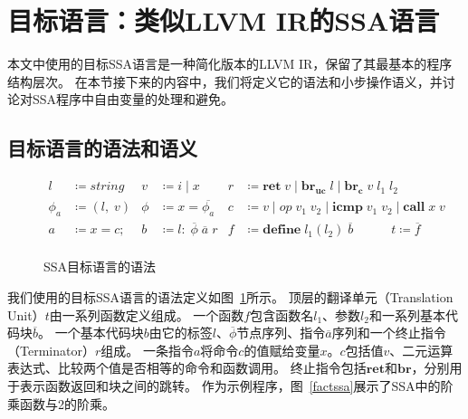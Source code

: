 \section{目标语言：类似LLVM IR的SSA语言}

本文中使用的目标SSA语言是一种简化版本的LLVM IR，保留了其最基本的程序结构层次。
在本节接下来的内容中，我们将定义它的语法和小步操作语义，并讨论对SSA程序中自由变量的处理和避免。

\subsection{目标语言的语法和语义}

\begin{figure}[htbp]
    \centering
    \begin{equation}
        \nonumber
        \begin{aligned}
            l &\coloneqq string & v &\coloneqq i\; |\; x & r &\coloneqq \mathbf{ret}\; v\; |\; \mathbf{br_{uc}}\; l\; |\; \mathbf{br_c}\; v\; l_1\; l_2 \\
            \phi_a &\coloneqq (l,\; v) & \phi &\coloneqq x = \overline{\phi_a} &  c &\coloneqq v\; |\; op\; v_1\; v_2\; |\; \mathbf{icmp}\; v_1\; v_2\; |\; \mathbf{call}\; x\; v \\
            a &\coloneqq x = c; & b &\coloneqq l:\; \overline{\phi}\; \overline{a}\; r & f &\coloneqq \mathbf{define}\; l_1(l_2)\; \overline{b} \quad\quad\quad t \coloneqq \overline{f} \\
        \end{aligned}
    \end{equation}
    \caption{SSA目标语言的语法}\label{synssa}
\end{figure}

我们使用的目标SSA语言的语法定义如图~\ref{synssa}所示。
顶层的翻译单元（Translation Unit）$t$由一系列函数定义组成。
一个函数$f$包含函数名$l_1$、参数$l_2$和一系列基本代码块$\overline{b}$。
一个基本代码块$b$由它的标签$l$、$\overline{\phi}$节点序列、指令$\overline{a}$序列和一个终止指令（Terminator）$r$组成。
一条指令$a$将命令$c$的值赋给变量$x$。$c$包括值$v$、二元运算表达式、比较两个值是否相等的命令和函数调用。
终止指令包括$\mathbf{ret}$和$\mathbf{br}$，分别用于表示函数返回和块之间的跳转。
作为示例程序，图~\ref{factssa}展示了SSA中的阶乘函数与2的阶乘。

